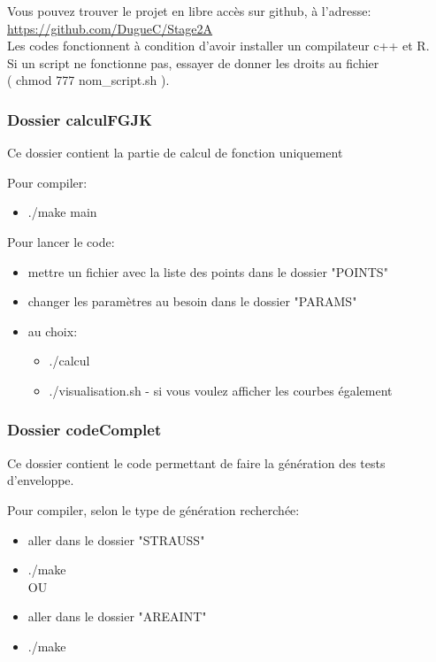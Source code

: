 \documentclass[stage2a]{tnreport}
\begin{document}
Vous pouvez trouver le projet en libre accès sur github, à l'adresse:\\
\hspace*{2cm} \url{https://github.com/DugueC/Stage2A}\\

Les codes fonctionnent à condition d'avoir installer un compilateur c++ et R.\\
Si un script ne fonctionne pas, essayer de donner les droits au fichier\\ ( chmod 777 nom\_script.sh ).
 

\subsubsection{Dossier calculFGJK}

Ce dossier contient la partie de calcul de fonction uniquement

Pour compiler:
\begin{itemize}[label=\textbullet]
\item ./make main\\
\end{itemize}

Pour lancer le code:
\begin{itemize}[label=\textbullet]
\item mettre un fichier avec la liste des points dans le dossier "POINTS"
\item changer les paramètres au besoin dans le dossier "PARAMS"
\item au choix:
    \begin{itemize}[label=\textbullet]
    \item ./calcul
    \item  ./visualisation.sh - si vous voulez afficher les courbes également\\
    \end{itemize}
\end{itemize}




\subsubsection{Dossier codeComplet}

Ce dossier contient le code permettant de faire la génération des tests d'enveloppe.

Pour compiler, selon le type de génération recherchée:
\begin{itemize}[label=\textbullet]
\item aller dans le dossier "STRAUSS"
\item ./make \\
OU
\item aller dans le dossier "AREAINT"
\item ./make
\end{itemize}
\end{document}
